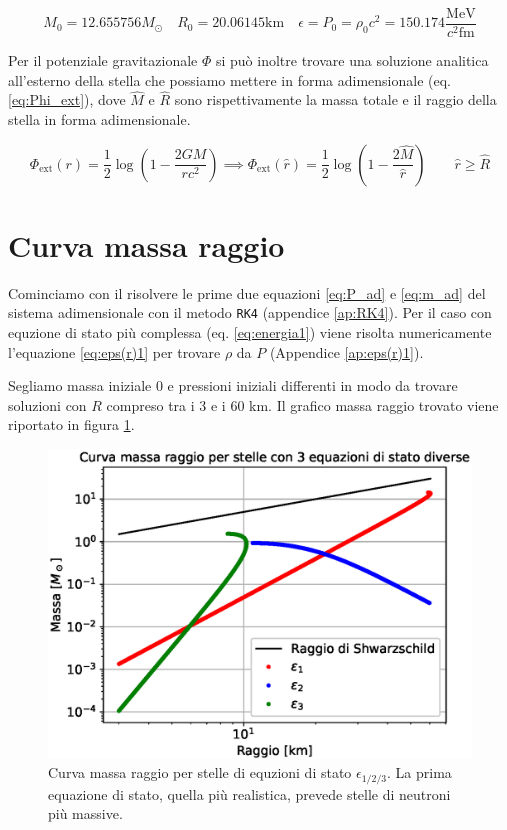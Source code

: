 \documentclass[a4paper, titlepage]{article}
\newcommand{\Punit}[0]{\frac{\unit{\mega\electronvolt}}{c^2 \unit{\femto\meter}}}
\begin{document}
\begin{equation}
    M_0 = 12.655756 M_\odot \quad R_0 = 20.06145 \unit{\kilo\meter} \quad \epsilon = P_0 = \rho_0 c^2 = 150.174 \Punit
    \label{eq:val_cost}
\end{equation}

Per il potenziale gravitazionale $\Phi$ si può inoltre trovare una soluzione analitica all'esterno della stella che possiamo mettere in forma adimensionale (eq. \ref{eq:Phi_ext}), dove $\hat{M}$ e $\hat R$ sono rispettivamente la massa totale e il raggio della stella in forma adimensionale.

\begin{equation}
    \Phi_\text{ext} (r) = \frac{1}{2} \log(1 - \frac{2 G M}{r c^2})
    \implies \Phi_\text{ext} (\hat r) = \frac{1}{2} \log(1 - \frac{2 \hat{M}}{\hat r}) \quad \quad \hat r \geq \hat{R}
    \label{eq:Phi_ext}
\end{equation}


\section{Curva massa raggio}
Cominciamo con il risolvere le prime due equazioni \ref{eq:P_ad} e \ref{eq:m_ad} del sistema adimensionale con il metodo \texttt{RK4} (appendice \ref{ap:RK4}).
Per il caso con equzione di stato più complessa (eq. \ref{eq:energia1}) viene risolta numericamente l'equazione \ref{eq:eps(r)1} per trovare $\rho$ da $P$ (Appendice \ref{ap:eps(r)1}).

Segliamo massa iniziale 0 e pressioni iniziali differenti in modo da trovare soluzioni con $R$ compreso tra i 3 e i 60 \unit{\kilo\meter}. Il grafico massa raggio trovato viene riportato in figura \ref{fig:MR}.

\begin{figure}[h]
        \centering
        \includegraphics[width = 0.6 \textwidth]{Figures/MR.eps}
        \caption{Curva massa raggio per stelle di equzioni di stato $\epsilon_{1/2/3}$. La prima equazione di stato, quella più realistica, prevede stelle di neutroni più massive.}
        \label{fig:MR}
\end{figure}
\end{document}
